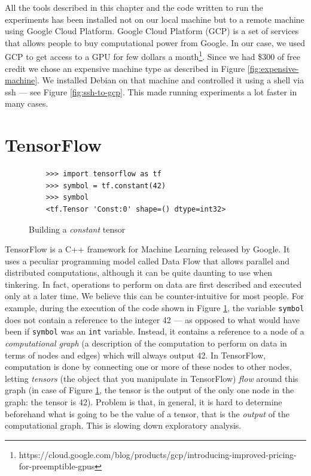 All the tools described in this chapter and the code written to run the
experiments has been installed not on our local machine but to a remote
machine using Google Cloud Platform. Google Cloud Platform (GCP) is a
set of services that allows people to buy computational power from
Google. In our case, we used GCP to get access to a GPU for few dollars
a
month\footnote{https://cloud.google.com/blog/products/gcp/introducing-improved-pricing-for-preemptible-gpus}.
Since we had \$300 of free credit we chose an expensive machine type as
described in Figure \ref{fig:expensive-machine}. We installed Debian on
that machine and controlled it using a shell via ssh --- see Figure
\ref{fig:ssh-to-gcp}. This made running experiments a lot faster in
many cases.

\section{TensorFlow}
\label{sec:tensorflow}

\begin{figure}
  \begin{verbatim}
    >>> import tensorflow as tf
    >>> symbol = tf.constant(42)
    >>> symbol
    <tf.Tensor 'Const:0' shape=() dtype=int32>
  \end{verbatim}
  \caption{Building a \emph{constant} tensor}
  \label{fig:fortytwo}
\end{figure}

TensorFlow is a C++ framework for Machine Learning released by Google.
It uses a peculiar programming model called Data Flow that allows
parallel and distributed computations, although it can be quite
daunting to use when tinkering. In fact, operations to perform on data
are first described and executed only at a later time. We believe this
can be counter-intuitive for most people. For example, during the
execution of the code shown in Figure \ref{fig:fortytwo}, the variable
\texttt{symbol} does not contain a reference to the integer 42 --- as
opposed to what would have been if \texttt{symbol} was an \texttt{int}
variable. Instead, it contains a reference to a node of a
\emph{computational graph} (a description of the computation to perform
on data in terms of nodes and edges) which will always output 42. In
TensorFlow, computation is done by connecting one or more of these nodes
to other nodes, letting \emph{tensors} (the object that you manipulate
in TensorFlow) \emph{flow} around this
graph (in case of Figure \ref{fig:fortytwo}, the tensor is the output
of the only one node in the graph: the tensor is 42). Problem is that,
in general, it is hard to
determine beforehand what is going to be the value of a tensor, that is the
\emph{output} of the computational graph. This is slowing down
exploratory analysis.

